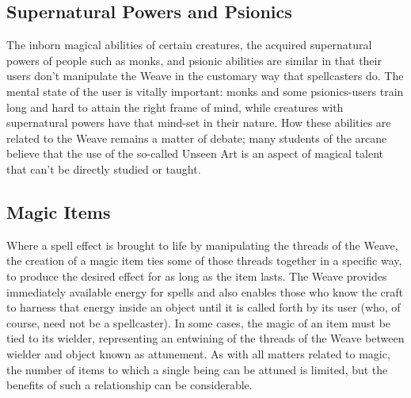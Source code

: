 \documentclass[10pt,a4paper,twoside,twocolumn,openany,bg=print,nodeprecatedcode]{dndbook}
\begin{document}
\subsection{Supernatural Powers and Psionics}
The inborn magical abilities of certain creatures, the acquired supernatural powers of people such as monks, and psionic abilities are similar in that their users don't manipulate the Weave in the customary way that spellcasters do. The mental state of the user is vitally important: monks and some psionics-users train long and hard to attain the right frame of mind, while creatures with supernatural powers have that mind-set in their nature. How these abilities are related to the Weave remains a matter of debate; many students of the arcane believe that the use of the so-called Unseen Art is an aspect of magical talent that can't be directly studied or taught.
\subsection{Magic Items}
Where a spell effect is brought to life by manipulating the threads of the Weave, the creation of a magic item ties some of those threads together in a specific way, to produce the desired effect for as long as the item lasts. The Weave provides immediately available energy for spells and also enables those who know the craft to harness that energy inside an object until it is called forth by its user (who, of course, need not be a spellcaster).
In some cases, the magic of an item must be tied to its wielder, representing an entwining of the threads of the Weave between wielder and object known as attunement. As with all matters related to magic, the number of items to which a single being can be attuned is limited, but the benefits of such a relationship can be considerable.
\end{document}
